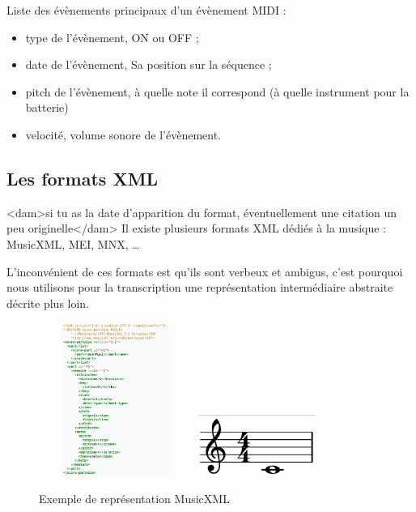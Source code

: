 Liste des évènements principaux d’un évènement MIDI :
\begin{itemize}
    \item type de l’évènement, ON ou OFF ;
    \item date de l’évènement, Sa position sur la séquence ;
    \item pitch de l’évènement, à quelle note il correspond (à quelle
        instrument pour la batterie)
    \item velocité, volume sonore de l’évènement.\\
\end{itemize}


\subsection*{Les formats XML}
<dam>si tu as la date d'apparition du format, éventuellement une citation un
peu originelle</dam>
Il existe plusieurs formats XML dédiés à la musique : MusicXML, MEI, MNX, …

L’inconvénient de ces formats est qu’ils sont verbeux et ambigus, c’est
pourquoi nous utilisons pour la transcription une représentation intermédiaire
abstraite décrite plus loin.


\begin{figure}[h]
	\centering
	\includegraphics[height=50mm, width=50mm]{
    z_images/1_contexte/6_musicxml_0.png}
    \includegraphics[height=20mm, width=40mm]{
    z_images/1_contexte/6_musicxml_1.png}
	\caption{Exemple de représentation MusicXML} 
	\label{MusicXML}
\end{figure}


